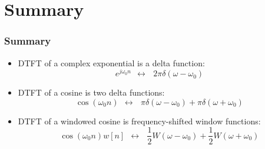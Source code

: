 \documentclass{beamer}
\begin{document}
\section[Summary]{Summary}
\setcounter{subsection}{1}

\begin{frame}
  \frametitle{Summary}

  \begin{itemize}
  \item DTFT of a complex exponential is a delta function:
    \begin{displaymath}
      e^{j\omega_0 n}~~\leftrightarrow~~~2\pi\delta(\omega-\omega_0)
    \end{displaymath}
  \item DTFT of a cosine is two delta functions:
    \begin{displaymath}
      \cos(\omega_0 n)~~\leftrightarrow~~~\pi\delta(\omega-\omega_0)+\pi\delta(\omega+\omega_0)
    \end{displaymath}
  \item DTFT of a windowed cosine is frequency-shifted window functions:
    \begin{displaymath}
      \cos(\omega_0 n)w[n]~~\leftrightarrow~~~\frac{1}{2}W(\omega-\omega_0)+\frac{1}{2}W(\omega+\omega_0)
    \end{displaymath}
  \end{itemize}
\end{frame}
\end{document}
